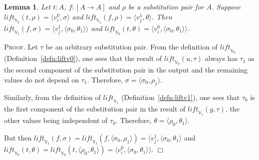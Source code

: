 \documentclass{article}
\newtheorem{lemma}[definition]{Lemma}
\newenvironment{proof}{\smallskip\textsc{Proof.}}{\hspace*{\fill}$\Box$}
\newcommand{\V}{{\mathbb V}}
\newcommand{\liftv}[1]{\ensuremath{\mathit{lift}_{\V_{#1}}}}
\begin{document}
\begin{lemma}\label{liftv0commv1}
Let $t:A$, $f:[A\to A]$ and $\rho$ be a substitution pair for $A$.
Suppose $\liftv0(t,\rho)=\langle v^0_i,\sigma\rangle$ and
$\liftv1(f,\rho)=\langle v^1_j,\theta\rangle$.
Then
$\liftv1(f,\sigma)=\langle v^1_j,\langle\sigma_0,\theta_1\rangle\rangle$ and
$\liftv0(t,\theta)=\langle v^0_i,\langle\sigma_0,\theta_1\rangle\rangle$.
\end{lemma}
\begin{proof}
Let $\tau$ be an arbitrary substitution pair.  From the definition of
$\liftv0$ (Definition~\ref{defn:liftv0}), one sees that the result of
$\liftv0(u,\tau)$ always has $\tau_1$ as the second component of the
substitution pair in the output and the remaining values do not depend
on $\tau_1$.  Therefore, $\sigma=\langle\sigma_0,\rho_1\rangle$.

Similarly, from the definition of $\liftv1$
(Definition~\ref{defn:liftv1}), one sees that $\tau_0$ is the first
component of the substitution pair in the result of $\liftv1(g,\tau)$,
the other values being independent of $\tau_0$.  Therefore,
$\theta=\langle\rho_0,\theta_1\rangle$.

But then $\liftv1(f,\sigma)=\liftv1(f,\langle\sigma_0,\rho_1\rangle)=%
\langle v^1_j,\langle\sigma_0,\theta_1\rangle$ and $\liftv0(t,\theta)=%
\liftv0(t,\langle\rho_0,\theta_1\rangle)=%
\langle v^0_i,\langle\sigma_0,\theta_1\rangle\rangle$.
\end{proof}
\end{document}
